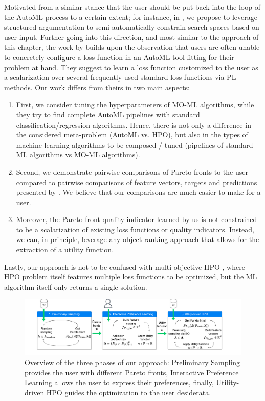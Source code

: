 Motivated from a similar stance that the user should be put back into the loop of the AutoML process to a certain extent; for instance, in , we propose to leverage structured argumentation to semi-automatically constrain search spaces based on user input. Further going into this direction, and most similar to the approach of this chapter, the work by \citet{kulbach-ecai20a} builds upon the observation that users are often unable to concretely configure a loss function in an AutoML tool fitting for their problem at hand. They suggest to learn a loss function customized to the user as a scalarization over several frequently used standard loss functions via PL methods. Our work differs from theirs in two main aspects: 
\begin{enumerate}
    \item First, we consider tuning the hyperparameters of MO-ML algorithms, while they try to find complete AutoML pipelines with standard classification/regression algorithms. Hence, there is not only a difference in the considered meta-problem (AutoML vs. HPO), but also in the types of machine learning algorithms to be composed / tuned (pipelines of standard ML algorithms vs MO-ML algorithms).
    \item Second, we demonstrate pairwise comparisons of Pareto fronts to the user compared to pairwise comparisons of feature vectors, targets and predictions presented by \citet{kulbach-ecai20a}. We believe that our comparisons are much easier to make for a user.
    \item Moreover, the Pareto front quality indicator learned by us is not constrained to be a scalarization of existing loss functions or quality indicators. Instead, we can, in principle, leverage any object ranking approach that allows for the extraction of a utility function.
\end{enumerate}

Lastly, our approach is not to be confused with multi-objective HPO \cite{moraleshernandez-arxiv21a,karl-arxiv22a}, where HPO problem itself features multiple loss functions to be optimized, but the ML algorithm itself only returns a single solution.

\begin{figure}[!ht]
\centering
\includegraphics[width=1\columnwidth]{chapters/human-centric/moo/img/method.pdf} 
\caption{Overview of the three phases of our approach: Preliminary Sampling provides the user with different Pareto fronts, Interactive Preference Learning allows the user to express their preferences, finally, Utility-driven HPO guides the optimization to the user desiderata.}
\label{moo-fig:method}
\end{figure}

